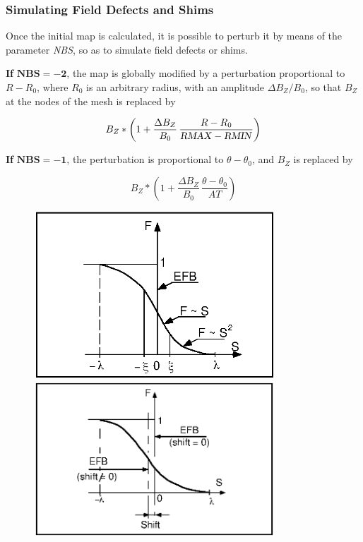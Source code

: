  
 \subsubsection*{Simulating Field Defects and Shims } 
 
  Once the initial map is calculated, it is possible to perturb it by
means of the parameter \textsl{NBS}, so as to simulate field defects or shims. 
\bigskip

\noindent\textbf{If} $\mathbf{NBS = -2}$, the map is globally modified by a
perturbation proportional to $ R-R_0 $, where $ R_0 $ is an arbitrary radius, 
with an amplitude $ \Delta B_Z/B_0 $, so that $ B_Z $ at the nodes of the mesh is replaced by 

$$ B_Z \ast  \left( 1+ \dfrac{\Delta B_Z }{ B_0} \,
                 \dfrac{R-R_0 }{\text{\textsl{RMAX}} - \text{\textsl{RMIN}}} \right) $$


\noindent\textbf{If} $\mathbf{NBS = -1}$, the perturbation is proportional to
$ \theta -\theta_ 0 $, and $ B_Z $ is replaced by 

$$ B_Z \ast  \left(1+ \dfrac{\Delta B_Z }{ B_0}\, \dfrac {\theta -\theta_ 0 }{ AT}\right) $$


\newpage

\begin{figure}[H]
  \centering
  \includegraphics[width=9cm]{Fig10.ps}
  \vfill
  \includegraphics[width=9cm]{Fig11.ps}
{\setlength{\captionwidth}{10cm}
}
\end{figure}


